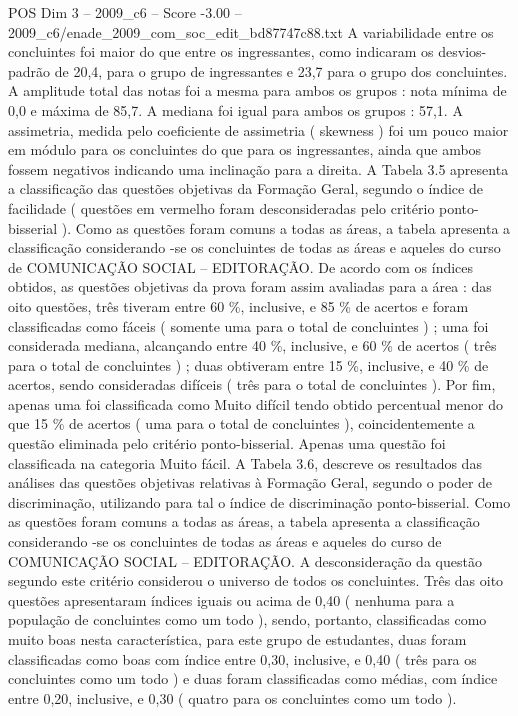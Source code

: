 \begin{textsample}{POS Dim 3 – 2009\_c6 – Score -3.00 – 2009\_c6/enade\_2009\_com\_soc\_edit\_bd87747c88.txt}
A variabilidade entre os concluintes foi maior do que entre os ingressantes, como indicaram os desvios-padrão de 20,4, para o grupo de ingressantes e 23,7 para o grupo dos concluintes.
A amplitude total das notas foi a mesma para ambos os grupos : nota mínima de 0,0 e máxima de 85,7.
A mediana foi igual para ambos os grupos : 57,1.
A assimetria, medida pelo coeficiente de assimetria ( skewness ) foi um pouco maior em módulo para os concluintes do que para os ingressantes, ainda que ambos fossem negativos indicando uma inclinação para a direita.
A Tabela 3.5 apresenta a classificação das questões objetivas da Formação Geral, segundo o índice de facilidade ( questões em vermelho foram desconsideradas pelo critério ponto-bisserial ).
Como as questões foram comuns a todas as áreas, a tabela apresenta a classificação considerando -se os concluintes de todas as áreas e aqueles do curso de COMUNICAÇÃO SOCIAL – EDITORAÇÃO.
De acordo com os índices obtidos, as questões objetivas da prova foram assim avaliadas para a área : das oito questões, três tiveram entre 60 \%, inclusive, e 85 \% de acertos e foram classificadas como fáceis ( somente uma para o total de concluintes ) ; uma foi considerada mediana, alcançando entre 40 \%, inclusive, e 60 \% de acertos ( três para o total de concluintes ) ; duas obtiveram entre 15 \%, inclusive, e 40 \% de acertos, sendo consideradas difíceis ( três para o total de concluintes ).
Por fim, apenas uma foi classificada como Muito difícil tendo obtido percentual menor do que 15 \% de acertos ( uma para o total de concluintes ), coincidentemente a questão eliminada pelo critério ponto-bisserial.
Apenas uma questão foi classificada na categoria Muito fácil.
A Tabela 3.6, descreve os resultados das análises das questões objetivas relativas à Formação Geral, segundo o poder de discriminação, utilizando para tal o índice de discriminação ponto-bisserial.
Como as questões foram comuns a todas as áreas, a tabela apresenta a classificação considerando -se os concluintes de todas as áreas e aqueles do curso de COMUNICAÇÃO SOCIAL – EDITORAÇÃO.
A desconsideração da questão segundo este critério considerou o universo de todos os concluintes.
Três das oito questões apresentaram índices iguais ou acima de 0,40 ( nenhuma para a população de concluintes como um todo ), sendo, portanto, classificadas como muito boas nesta característica, para este grupo de estudantes, duas foram classificadas como boas com índice entre 0,30, inclusive, e 0,40 ( três para os concluintes como um todo ) e duas foram classificadas como médias, com índice entre 0,20, inclusive, e 0,30 ( quatro para os concluintes como um todo ).

\end{textsample}
